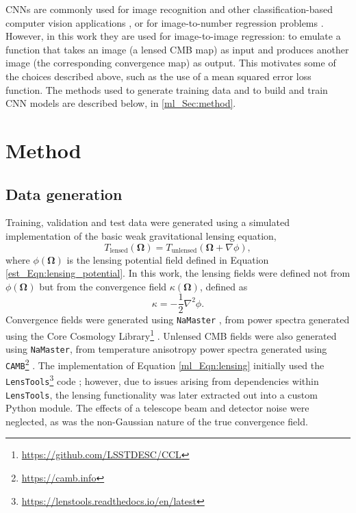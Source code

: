 CNNs are commonly used for image recognition and other classification-based computer vision applications \citep[e.g.][]{Dieleman2015, Chen2016, Howard2017}, or for image-to-number regression problems \citep[e.g.][]{Nibali2018, Baldi2019, Pyo2019}. However, in this work they are used for image-to-image regression: to emulate a function that takes an image (a lensed CMB map) as input and produces another image (the corresponding convergence map) as output. This motivates some of the choices described above, such as the use of a mean squared error loss function. The methods used to generate training data and to build and train CNN models are described below, in \autoref{ml_Sec:method}.

\section{Method}
\label{ml_Sec:method}

\subsection{Data generation}
\label{ml_Sec:data_generation}

Training, validation and test data were generated using a simulated implementation of the basic weak gravitational lensing equation,
\begin{equation}
T_\text{lensed} \left( \bm{\Omega} \right)
=
T_\text{unlensed} \left( \bm{\Omega} + \nabla \phi \right),
\label{ml_Eqn:lensing}
\end{equation}
where $\phi \left( \bm{\Omega} \right)$ is the lensing potential field defined in Equation \eqref{est_Eqn:lensing_potential}. In this work, the lensing fields were defined not from $\phi \left( \bm{\Omega} \right)$ but from the convergence field $\kappa \left( \bm{\Omega} \right)$, defined as
\begin{equation}
\kappa = - \frac{1}{2} \nabla^2 \phi.
\end{equation}
Convergence fields were generated using \texttt{NaMaster} \citep{Alonso2019}, from power spectra generated using the Core Cosmology Library\footnote{\url{https://github.com/LSSTDESC/CCL}} \citep{Chisari2019}. Unlensed CMB fields were also generated using \texttt{NaMaster}, from temperature anisotropy power spectra generated using \texttt{CAMB}\footnote{\url{https://camb.info}} \citep{Lewis2000, Howlett2012}. The implementation of Equation \eqref{ml_Eqn:lensing} initially used the \texttt{LensTools}\footnote{\url{https://lenstools.readthedocs.io/en/latest}} code \citep{Petri2016lenstools}; however, due to issues arising from dependencies within \texttt{LensTools}, the lensing functionality was later extracted out into a custom Python module. The effects of a telescope beam and detector noise were neglected, as was the non-Gaussian nature of the true convergence field.

